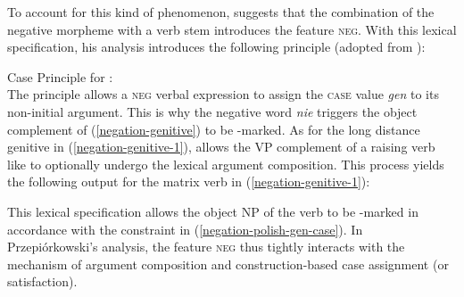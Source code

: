 \documentclass[output=paper
	        ,collection
	        ,collectionchapter
 	        ,biblatex
                ,babelshorthands
                ,newtxmath
                ,draftmode
                ,colorlinks, citecolor=brown
]{langscibook}
\begin{document}
\begin{exe}
\begin{xlist}
\iffalse{
\eal
\ex \label{negation-genitive-1}
\gll Pisz\c{e} listy /*list\'{o}w.
     write.1\textsc{sg} letters.\textsc{acc}/letters.\textsc{gen}\\
\glt `I am writing letters.'

\ex
\gll Nie chcialem   pisa\'{c} list\'{o}w. \\
     \textsc{neg} wanted.1\sg.\mas{} write.\textsc{inf} letters.\textsc{gen}\\
\glt `I didn't want to write letters.'
\zl}\fi
To account for this kind of phenomenon, \citet{Prz:00}
suggests that the combination of the
negative morpheme  with a verb stem introduces the
feature \textsc{neg}.
  With this lexical specification, his analysis introduces
 the following principle (adopted from \citealt[]{Prz:00}):

\ea
\label{negation-polish-gen-case}
Case Principle for :\\
  \impl
{}
\z
The principle allows a \textsc{neg} verbal expression to assign
 the \textsc{case} value \textit{gen} to its non-initial argument.
%
This is why the negative word \textit{nie} triggers
 the object complement of
(\ref{negation-genitive}) to be \GEN-marked.
As for the long distance genitive in (\ref{negation-genitive-1}), \citet[]{Prz:00}
allows the VP complement of a raising verb like  to optionally undergo the lexical
argument composition. This process yields the following output for the
matrix verb in (\ref{negation-genitive-1}):

\ea
\label{negation-polish-case}
\z
%
This lexical specification allows the object NP of the verb to be
\GEN-marked in accordance with the constraint in (\ref{negation-polish-gen-case}).
In Przepiórkowski's analysis, the feature
\textsc{neg} thus tightly interacts with the mechanism of argument composition and construction-based case assignment (or satisfaction).


\end{xlist}
\end{exe}
\end{document}
